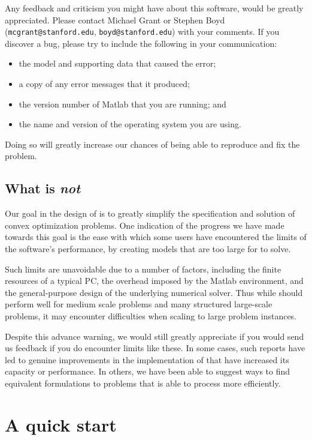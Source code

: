 \documentclass[12pt]{article}
\begin{document}
Any feedback and criticism you might
have about this software, would be greatly appreciated.
Please contact Michael Grant or Stephen Boyd 
(\texttt{mcgrant@stanford.edu}, \texttt{boyd@stanford.edu}) with your comments. If
you discover a bug, please try to include the following in your communication:
\begin{itemize}
\item the \cvx model and supporting data that caused the error;
\item a copy of any error messages that it produced;
\item the version number of Matlab that you are running; and
\item the name and version of the operating system you are using.
\end{itemize}
Doing so will greatly increase our chances of being able to reproduce and fix the problem.

\subsection{What \cvx is \emph{not}}

Our goal in the design of \cvx is to greatly simplify the 
specification and
solution of convex optimization problems. 
One indication of the progress we have made
towards this goal is the ease with which some users 
have encountered the limits
of the software's performance, by creating models that are too 
large for \cvx to solve.

Such limits are unavoidable due to a number of factors, including
the finite
resources of a typical PC, the overhead imposed by the Matlab 
environment,
and the general-purpose design of the underlying numerical solver.
Thus while \cvx should perform
well for medium scale problems and many structured large-scale 
problems, it may
encounter difficulties when scaling to large problem instances.

Despite this advance warning, 
we would still greatly appreciate if you would send
us feedback if you do encounter limits like these.
In some cases, such reports have led to genuine improvements in the
implementation of \cvx that have
increased its capacity or performance. 
In others, we have been able to suggest
ways to find equivalent formulations to problems that 
\cvx is able to process more efficiently.

\section{A quick start}
\label{sec:quickstart}
\end{document}

